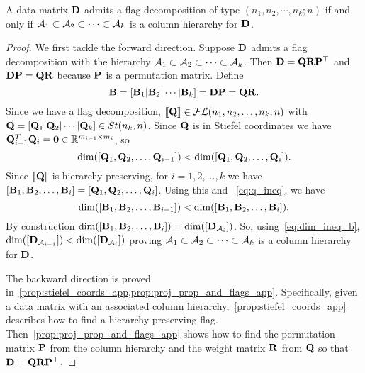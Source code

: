 \begin{prop}
    A data matrix $\mathbf{D}$ admits a flag decomposition of type $(n_1,n_2, \cdots, n_k; n)$ if and only if $\mathcal{A}_1 \subset \mathcal{A}_2 \subset \cdots \subset \mathcal{A}_k$ is a column hierarchy for $\mathbf{D}$.
\end{prop}

\begin{proof}
    We first tackle the forward direction. Suppose $\mathbf{D}$ admits a flag decomposition with the hierarchy $\mathcal{A}_1 \subset \mathcal{A}_2 \subset \cdots \subset \mathcal{A}_k$. Then $\mathbf{D} = \mathbf{Q} \mathbf{R} \mathbf{P}^\top$ and $\mathbf{D} \mathbf{P} = \mathbf{Q} \mathbf{R}$ because $\mathbf{P}$ is a permutation matrix. 
    Define 
    \begin{equation}
        \mathbf{B} = [\mathbf{B}_1| \mathbf{B}_2 | \cdots | \mathbf{B}_k] = \mathbf{D} \mathbf{P} = \mathbf{Q}\mathbf{R}.
    \end{equation} 
    Since we have a flag decomposition, $[\![\mathbf{Q}]\!] \in \mathcal{FL}(n_1,n_2,\dots,n_k;n)$ with $\mathbf{Q} = [\mathbf{Q}_1|\mathbf{Q}_2|\cdots|\mathbf{Q}_k] \in St(n_k,n)$. Since $\mathbf{Q}$ is in Stiefel coordinates we have $\mathbf{Q}_{i-1}^T\mathbf{Q}_{i} = \bm{0} \in \mathbb{R}^{m_{i-1} \times m_i}$, so
    \begin{equation}\label{eq:q_ineq}
        \mathrm{dim}([\mathbf{Q}_1, \mathbf{Q}_2, \dots,\mathbf{Q}_{i-1}]) < \mathrm{dim}([\mathbf{Q}_1, \mathbf{Q}_2, \dots,\mathbf{Q}_i]).
    \end{equation} 
    Since $[\![\mathbf{Q}]\!]$ is hierarchy preserving, for $i=1,2,\dots,k$ we have $[\mathbf{B}_1,\mathbf{B}_2,\dots,\mathbf{B}_i] = [\mathbf{Q}_1, \mathbf{Q}_2, \dots,\mathbf{Q}_i]$. Using this and ~\cref{eq:q_ineq}, we have
    \begin{equation}\label{eq:dim_ineq_b}
        \mathrm{dim}([\mathbf{B}_1, \mathbf{B}_2, \dots,\mathbf{B}_{i-1}]) < \mathrm{dim}([\mathbf{B}_1, \mathbf{B}_2, \dots,\mathbf{B}_i]).
    \end{equation}
    By construction $\mathrm{dim}([\mathbf{B}_1,\mathbf{B}_2,\dots,\mathbf{B}_i]) = \mathrm{dim}([\mathbf{D}_{\mathcal{A}_i}])$. So, using~\cref{eq:dim_ineq_b}, $\mathrm{dim}([\mathbf{D}_{\mathcal{A}_{i-1}}]) < \mathrm{dim}([\mathbf{D}_{\mathcal{A}_i}])$ proving $\mathcal{A}_1 \subset \mathcal{A}_2 \subset \cdots \subset \mathcal{A}_k$ is a column hierarchy for $\mathbf{D}$.

    The backward direction is proved in~\cref{prop:stiefel_coords_app,prop:proj_prop_and_flags_app}. Specifically, given a data matrix with an associated column hierarchy,~\cref{prop:stiefel_coords_app} describes how to find a hierarchy-preserving flag. Then~\cref{prop:proj_prop_and_flags_app} shows how to find the permutation matrix $\mathbf{P}$ from the column hierarchy and the weight matrix $\mathbf{R}$ from $\mathbf{Q}$ so that $\mathbf{D} = \mathbf{Q} \mathbf{R} \mathbf{P}^\top$.
    \end{proof}


